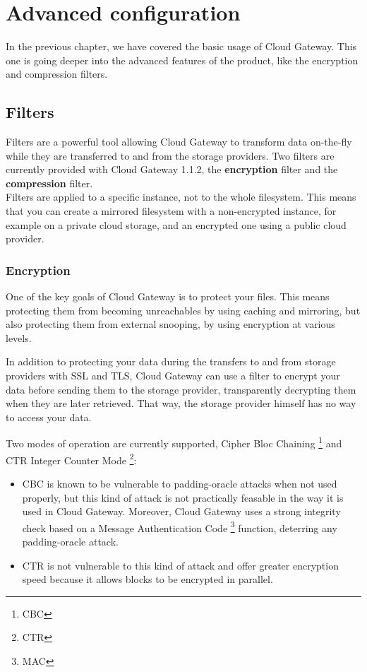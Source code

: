 \documentclass[11pt,fleqn,openany]{book} %
\newcommand{\cgversion}{1.1.2}
\begin{document}
\cleardoublepage %
\chapter{Advanced configuration}
\label{chap:advanced-configuration}

In the previous chapter, we have covered the basic usage of Cloud Gateway. This one is going deeper
into the advanced features of the product, like the encryption and compression filters.

\section{Filters}
\label{sec:filters}

Filters are a powerful tool allowing Cloud Gateway to transform data on-the-fly while
they are transferred to and from the storage providers. Two filters are currently provided
with Cloud Gateway \cgversion, the \textbf{encryption} filter and
the \textbf{compression} filter.\\

Filters are applied to a specific instance, not to the whole filesystem. This means that you can
create a mirrored filesystem with a non-encrypted instance, for example on a private cloud storage,
and an encrypted one using a public cloud provider.

\subsection{Encryption}

One of the key goals of Cloud Gateway is to protect your files. This means protecting them
from becoming unreachables by using caching and mirroring, but also protecting them from
external snooping, by using encryption at various levels.

In addition to protecting your data during the transfers to and from storage providers with SSL and TLS,
Cloud Gateway can use a filter to encrypt your data before sending them to the storage provider,
transparently decrypting them when they are later retrieved. That way, the storage provider himself
has no way to access your data.

Two modes of operation are currently supported, Cipher Bloc Chaining \footnote{CBC} and CTR Integer Counter Mode \footnote{CTR}:
\begin{itemize}
\item{CBC} is known to be vulnerable to padding-oracle attacks when not used properly, but this kind of attack is
not practically feasable in the way it is used in Cloud Gateway. Moreover, Cloud Gateway uses a strong integrity check based on a Message Authentication
Code \footnote{MAC} function, deterring any padding-oracle attack.
\item{CTR} is not vulnerable to this kind of attack and offer greater encryption speed because it allows blocks to be encrypted in parallel.\\
\end{itemize}
\end{document}
